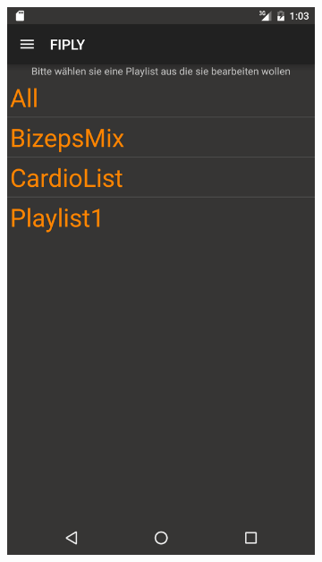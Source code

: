 \documentclass[FIPLY_base.tex]{subfiles}
\begin{document}
\begin{figure}[h]
	\begin{subfigure}[b]{0.3\textwidth}
	\includegraphics[scale=0.15]{img/musicPlaylistView1}
	\end{subfigure}
	\hfil
	\begin{subfigure}[b]{0.3\textwidth}

\end{subfigure}
\end{figure}
\end{document}

